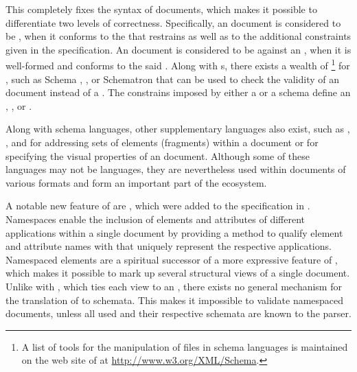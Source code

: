 \documentclass{book}
\begin{document}
This  completely fixes the syntax of  documents, which
makes it possible to differentiate two levels of correctness. Specifically, an
 document is considered to be %
, when it conforms to the 
 that restrains  as well as to the additional
constraints given in the specification. An  document is
considered to be   against an
 , when it is well-formed and conforms to the said
 .  Along with s, there exists a wealth
of \footnote{
  A list of tools for the manipulation of files in  schema
  languages is maintained on the web site of  at
  \url{http://www.w3.org/XML/Schema}.
} for , such as   Schema
, , or Schematron that can be used to
check the validity of an  document instead of a .
The constrains imposed by either a  or a schema define an
, , or .
 

Along with schema languages, other supplementary languages also exist, such as
, , and  for addressing sets of elements
(fragments) within a  document or  for specifying the
visual properties of an  document. Although some of these
languages may not be  languages, they are nevertheless used within
documents of various  formats and form an important part of the
ecosystem.

A notable new feature of  are %
, which were added to the specification
\cite{bray99} in \citeyear{bray99}. Namespaces enable the inclusion of elements
and attributes of different  applications within a single
 document by providing a method to qualify element and attribute
names with  that uniquely represent the respective 
applications. Namespaced elements are a spiritual successor of a more
expressive  feature of
, which makes it possible
to mark up several structural views of a single document. Unlike with
, which ties each view to an  ,
there exists no general mechanism for the translation of  to
 schemata. This makes it impossible to validate namespaced
 documents, unless all used  and their respective
schemata are known to the parser.
\end{document}
